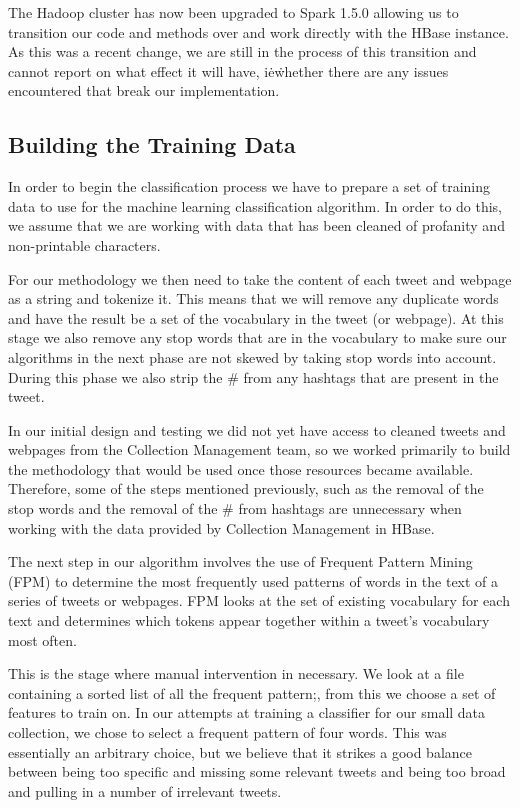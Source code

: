 The Hadoop cluster has now been upgraded to Spark 1.5.0 allowing us to transition our code and methods over and work directly with the HBase instance. As this was a recent change, we are still in the process of this transition and cannot report on what effect it will have, i\. e\. whether there are any issues encountered that break our implementation.

\subsection{Building the Training Data}
In order to begin the classification process we have to prepare a set of training data to use for the machine learning classification algorithm. In order to do this, we assume that we are working with data that has been cleaned of profanity and non-printable characters.

For our methodology we then need to take the content of each tweet and webpage as a string and tokenize it. This means that we will remove any duplicate words and have the result be a set of the vocabulary in the tweet (or webpage). At this stage we also remove any stop words that are in the vocabulary to make sure our algorithms in the next phase are not skewed by taking stop words into account. During this phase we also strip the \# from any hashtags that are present in the tweet.

In our initial design and testing we did not yet have access to cleaned tweets and webpages from the Collection Management team, so we worked primarily to build the methodology that would be used once those resources became available. Therefore, some of the steps mentioned previously, such as the removal of the stop words and the removal of the \# from hashtags are unnecessary when working with the data provided by Collection Management in HBase.

The next step in our algorithm involves the use of Frequent Pattern Mining (FPM) to determine the most frequently used patterns of words in the text of a series of tweets or webpages. FPM looks at the set of existing vocabulary for each text and determines which tokens appear together within a tweet's vocabulary most often.

This is the stage where manual intervention in necessary. We look at a file containing a sorted list of all the frequent pattern;, from this we choose a set of features to train on. In our attempts at training a classifier for our small data collection, we chose to select a frequent pattern of four words. This was essentially an arbitrary choice, but we believe that it strikes a good balance between being too specific and missing some relevant tweets and being too broad and pulling in a number of irrelevant tweets.


